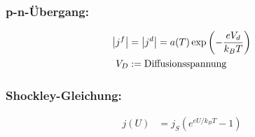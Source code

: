 \subsubsection*{p-n-Übergang:}
\begin{equation*}
    \begin{aligned}
        \left\vert j^f\right\vert &= \left\vert j^d\right\vert = a(T) \exp \left(- \frac{eV_d}{k_B T}\right) \\
        V_D &:= \text{Diffusionsspannung}
    \end{aligned}
\end{equation*}

\subsubsection*{Shockley-Gleichung:}
\begin{equation*}
    \begin{aligned}
        j(U) &= j_S \left(e^{eU / k_B T} -1\right)
    \end{aligned}
\end{equation*}
